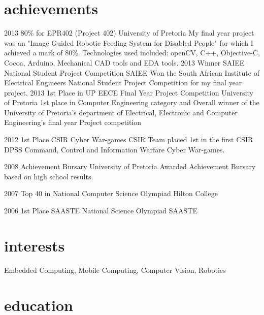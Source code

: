 \documentclass[a4paper]{friggeri-cv}
\begin{document}
\section{achievements}
\begin{entrylist}
	\entry
	{2013}
	{80\% for EPR402 (Project 402)}
	{University of Pretoria}
	{My final year project was an "Image Guided Robotic Feeding System for Disabled People" for which I achieved a mark of 80\%. Technologies used included: openCV, C++, Objective-C, Cocoa, Arduino, Mechanical CAD tools and EDA tools.}
	\entry
	{2013}
	{Winner SAIEE National Student Project Competition}
	{SAIEE}
	{Won the South African Institute of Electrical Engineers National Student Project Competition for my final year project.}
	\entry
	{2013}
	{1st Place in UP EECE Final Year Project Competition}
	{University of Pretoria}
	{1st place in Computer Engineering category and Overall winner of the University of Pretoria's department of Electrical, Electronic and Computer Engineering's final year Project competition}
	
	\entry
	{2012}
	{1st Place CSIR Cyber War-games}
	{CSIR}
	{Team placed 1st in the first CSIR DPSS Command, Control and Information Warfare Cyber War-games.}
	
	\entry
	{2008}
	{Achievement Bursary}
	{University of Pretoria}
	{Awarded Achievement Bursary based on high school results.}
	
\end{entrylist}
\begin{entrylist}
	
	\entry
	{2007}
	{Top 40 in National Computer Science Olympiad}
	{Hilton College}
	{}
	
	\entry
	{2006}
	{1st Place SAASTE National Science Olympiad}
	{SAASTE}
	{}

\end{entrylist}
\section{interests}
Embedded Computing, Mobile Computing, Computer Vision, Robotics 

\section{education}
\end{document}
